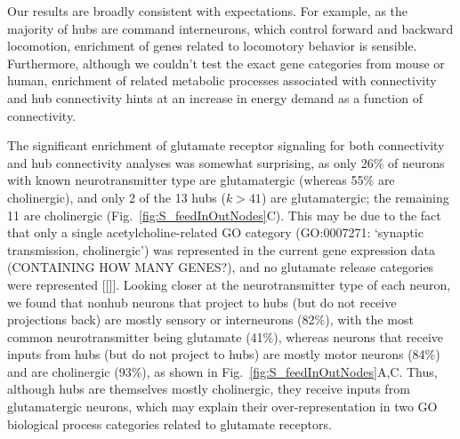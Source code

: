 \documentclass[10pt,letterpaper]{article}
\begin{document}
Our results are broadly consistent with expectations.
For example, as the majority of hubs are command interneurons, which control forward and backward locomotion, enrichment of genes related to locomotory behavior is sensible.
Furthermore, although we couldn't test the exact gene categories from mouse or human, enrichment of related metabolic processes associated with connectivity and hub connectivity hints at an increase in energy demand as a function of connectivity.

The significant enrichment of glutamate receptor signaling for both connectivity and hub connectivity analyses was somewhat surprising, as only 26\% of neurons with known neurotransmitter type are glutamatergic (whereas 55\% are cholinergic), and only 2 of the 13 hubs ($k > 41$) are glutamatergic; the remaining 11 are cholinergic (Fig.~\ref{fig:S_feedInOutNodes}C).
This may be due to the fact that only a single acetylcholine-related GO category (GO:0007271: `synaptic transmission, cholinergic') was represented in the current gene expression data (CONTAINING HOW MANY GENES?), and no glutamate release categories were represented [[]].
Looking closer at the neurotransmitter type of each neuron, we found that nonhub neurons that project to hubs (but do not receive projections back) are mostly sensory or interneurons (82\%), with the most common neurotransmitter being glutamate (41\%), whereas neurons that receive inputs from hubs (but do not project to hubs) are mostly motor neurons (84\%) and are cholinergic (93\%), as shown in Fig.~\ref{fig:S_feedInOutNodes}A,C.
Thus, although hubs are themselves mostly cholinergic, they receive inputs from glutamatergic neurons, which may explain their over-representation in two GO biological process categories related to glutamate receptors.
\end{document}
